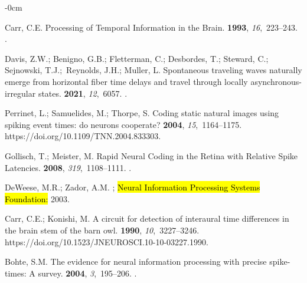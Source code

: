 \documentclass[brainsci, %
               review,accept,pdftex,moreauthors
               ]{Definitions/mdpi}
\begin{document}
\begin{adjustwidth}{-\extralength}{0cm}
\begin{thebibliography}{999}
Carr, C.E.
\newblock Processing of {Temporal} {Information} in the {Brain}.
 {\bf 1993}, {\em 16},~223--243.\linebreak
{}.

Davis, Z.W.; Benigno, G.B.; Fletterman, C.; Desbordes, T.; Steward, C.;
  Sejnowski, T.J.;~Reynolds, J.H.; Muller, L.
\newblock Spontaneous traveling waves naturally emerge from horizontal fiber
  time delays and travel through locally asynchronous-irregular states.
 {\bf 2021}, {\em 12},~6057.
.

Perrinet, L.; Samuelides, M.; Thorpe, S.
\newblock Coding static natural images using spiking event times: do neurons
  cooperate?
 {\bf 2004}, {\em
  15},~1164--1175.
 {{https://doi.org/10.1109/TNN.2004.833303}}.

Gollisch, T.; Meister, M.
\newblock Rapid {Neural} {Coding} in the {Retina} with {Relative} {Spike}
  {Latencies}.
 {\bf 2008}, {\em 319},~1108--1111.
.

DeWeese, M.R.; Zador, A.M.
; \hl{Neural Information Processing
  Systems Foundation:} %
   2003.

Carr, C.E.; Konishi, M.
\newblock A circuit for detection of interaural time differences in the brain
  stem of the barn owl.
 {\bf 1990}, {\em 10},~3227--3246.
  {{https://doi.org/10.1523/JNEUROSCI.10-10-03227.1990}}.

Bohte, S.M.
\newblock The evidence for neural information processing with precise
  spike-times: {A} survey.
 {\bf 2004}, {\em 3},~195--206.
.


\end{thebibliography}
\end{adjustwidth}
\end{document}
